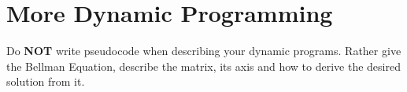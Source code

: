\documentclass[solutionorbox,answers]{exam}
\begin{document}
\begin{center}
\end{center}
\vspace{0.1in}
 \qquad
{}

\section*{More Dynamic Programming}

Do \textbf{NOT} write pseudocode when describing your dynamic programs. Rather give the Bellman Equation, describe the matrix, its axis and how to derive the desired solution from it.
\end{document}
